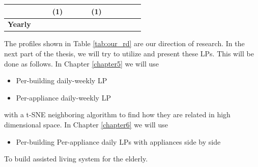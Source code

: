 \begin{table}[H]
\begin{tabular}{|c|cccc|cccc|cccc|}
      \multicolumn{1}{c|}{} &
      \multicolumn{1}{c|}{} &
      \multicolumn{1}{c|}{} &
      (1) &
      \multicolumn{1}{c|}{} &
      \multicolumn{1}{c|}{} &
      \multicolumn{1}{c|}{} &
      (1) &
      \multicolumn{1}{c|}{} &
      \multicolumn{1}{c|}{} &
      \multicolumn{1}{c|}{} &
       \\ \hline
    \textbf{Yearly} &
      \multicolumn{1}{c|}{} &
      \multicolumn{1}{c|}{} &
      \multicolumn{1}{c|}{} &
       &
      \multicolumn{1}{c|}{} &
      \multicolumn{1}{c|}{} &
      \multicolumn{1}{c|}{} &
       &
      \multicolumn{1}{c|}{} &
      \multicolumn{1}{c|}{} &
      \multicolumn{1}{c|}{} &
       \\ \hline
    \end{tabular}
    \end{table}

The profiles shown in Table \ref{tab:our_rd} are our direction of research.
In the next part of the thesis, we will try to utilize and present these LPs.
This will be done as follows.
In Chapter \ref{chapter5} we will use
\begin{itemize}
  \item Per-building daily-weekly LP
  \item Per-appliance daily-weekly LP
\end{itemize}
with a t-SNE neighboring algorithm to find how they are related in high dimensional space.
In Chapter \ref{chapter6} we will use
\begin{itemize}
  \item Per-building Per-appliance daily LPs with appliances side by side
\end{itemize}
To build assisted living system for the elderly.

